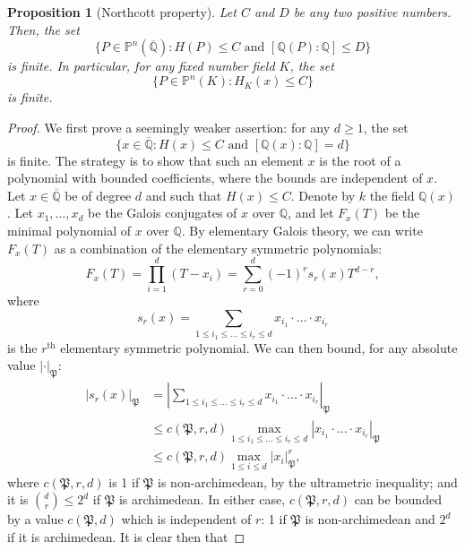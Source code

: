 \documentclass[a4paper, 12pt]{amsart}
\theoremstyle{definition}
\theoremstyle{plain}
\newtheorem{prop0}[defn0]{Proposition}
\theoremstyle{plain}
\theoremstyle{plain}
\theoremstyle{plain}
\theoremstyle{remark}
\theoremstyle{remark}
\theoremstyle{plain}
\newenvironment{proposition}{ \begin{prop0}}{\end{prop0}}
\newcommand{\Q}{\mathbb{Q}}
\renewcommand{\P}{\mathfrak{P}}
\begin{document}
	\begin{proposition}[Northcott property]\label{northcott}
		Let $C$ and $D$ be any two positive numbers. Then, the set
		\begin{equation*}
			\{P\in\mathbb{P}^n(\overline{\Q}): H(P)\le C \text{ and } [\Q(P):\Q]\le D\}
		\end{equation*}
		is finite. In particular, for any fixed number field $K$, the set
		\begin{equation*}
			\{P\in\mathbb{P}^n(K):H_K(x)\le C\}
		\end{equation*}
		is finite.
	\end{proposition}
	\begin{proof}
		We first prove a seemingly weaker assertion: for any $d\ge 1$, the set
		\begin{equation*}
			\{x\in\overline{\Q}: H(x)\le C\text{ and }[\Q(x):\Q]=d\}
		\end{equation*}
		is finite. The strategy is to show that such an element $x$ is the root of a polynomial with bounded coefficients, where the bounds are independent of $x$. Let $x\in\overline{\Q}$ be of degree $d$ and such that $H(x)\le C$. Denote by $k$ the field $\Q(x)$. Let $x_1,\ldots,x_d$ be the Galois conjugates of $x$ over $\Q$, and let $F_x(T)$ be the minimal polynomial of $x$ over $\Q$. By elementary Galois theory, we can write $F_x(T)$ as a combination of the elementary symmetric polynomials:
		\begin{equation*}
			F_x(T)=\prod_{i=1}^d(T-x_i)=\sum_{r=0}^d(-1)^rs_r(x)T^{d-r},
		\end{equation*}
		where
		\begin{equation*}
			s_r(x)=\sum_{1\le i_1\le\ldots\le i_r\le d}x_{i_1}\cdot\ldots\cdot x_{i_r}
		\end{equation*}
		is the $r^\text{th}$ elementary symmetric polynomial. We can then bound, for any absolute value $|\cdot|_\P$:
		\begin{align*}
			|s_r(x)|_\P&=\left|\sum_{1\le i_1\le\ldots\le i_r\le d}x_{i_1}\cdot\ldots\cdot x_{i_r}\right|_\P\\
			&\le c(\P,r,d)\max_{1\le i_1\le\ldots\le i_r\le d}|x_{i_1}\cdot\ldots\cdot x_{i_r}|_\P\\
			&\le c(\P,r,d)\max_{1\le i\le d}|x_i|^r_\P,
		\end{align*}
		where $c(\P,r,d)$ is 1 if $\P$ is non-archimedean, by the ultrametric inequality; and it is ${d\choose r}\le 2^d$ if $\P$ is archimedean. In either case, $c(\P,r,d)$ can be bounded by a value $c(\P,d)$ which is independent of $r$: 1 if $\P$ is non-archimedean and $2^d$ if it is archimedean. It is clear then that

\end{proof}
\end{document}
